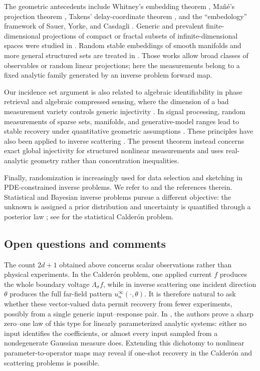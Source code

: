 \documentclass[11pt,oneside]{amsart}
\theoremstyle{plain}
\theoremstyle{definition}
\theoremstyle{remark}
\begin{document}
The geometric antecedents include Whitney's embedding theorem \cite{whitney1936}, Ma{\~n}{\'e}'s projection theorem \cite{mane1981dimension}, Takens' delay-coordinate theorem \cite{takens1981detecting}, and the ``embedology'' framework of Sauer, Yorke, and Casdagli \cite{sauer1991embedology}. Generic and prevalent finite-dimensional projections of compact or fractal subsets of infinite-dimensional spaces were studied in \cite{hunt1992prevalence,hunt1999regularity,robinson2009linear}. Random stable embeddings of smooth manifolds and more general structured sets are treated in \cite{baraniuk2009random,dirksen2016dimensionality}. Those works allow broad classes of observables or random linear projections; here the measurements belong to a fixed analytic family generated by an inverse problem forward map.

Our incidence set argument is also related to algebraic identifiability in phase retrieval and algebraic compressed sensing, where the dimension of a bad measurement variety controls generic injectivity \cite{conca2015algebraic,breiding2021algebraic}. In signal processing, random measurements of sparse sets, manifolds, and generative-model ranges lead to stable recovery under quantitative geometric assumptions \cite{candes2006robust,donoho2006compressed,Foucart2013-od,bora2017compressed}. These principles have also been applied to inverse scattering \cite{gilbert-levinson-schotland-2020,alberti-petit-santacesaria}. The present theorem instead concerns exact global injectivity for structured nonlinear measurements and uses real-analytic geometry rather than concentration inequalities.

Finally, randomization is increasingly used for data selection and sketching in PDE-constrained inverse problems. We refer to \cite{jin2024unique,HELLMUTH2026} and the references therein. Statistical and Bayesian inverse problems pursue a different objective: the unknown is assigned a prior distribution and uncertainty is quantified through a posterior law \cite{kaipio2005statistical,stuart2010inverse}; see \cite{abraham2020statistical} for the statistical Calder\'on problem.

\subsection{Open questions and comments}

The count $2d+1$ obtained above concerns scalar observations rather than
physical experiments. In the Calder\'on problem, one applied current $f$
produces the whole boundary voltage $\Lambda_\sigma f$, while in inverse
scattering one incident direction $\theta$ produces the full far-field pattern
$u_n^\infty(\cdot,\theta)$. It is therefore natural to ask whether these
vector-valued data permit recovery from fewer experiments, possibly from a
single generic input--response pair. In
\cite{boulle2026zero}, the authors prove a sharp zero--one law of this type for linearly
parameterized analytic systems: either no input identifies the coefficients,
or almost every input sampled from a nondegenerate Gaussian measure does.
Extending this dichotomy to nonlinear parameter-to-operator maps may reveal
if one-shot recovery in the Calder\'on and
scattering problems is possible.
\end{document}
